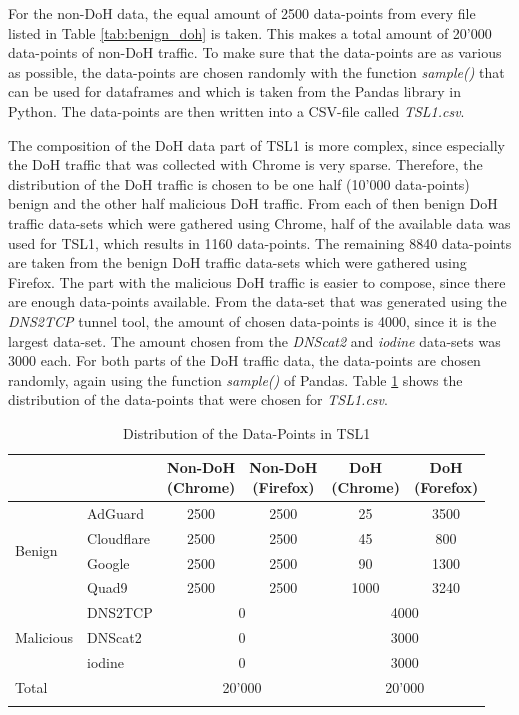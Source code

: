 For the non-DoH data, the equal amount of 2500 data-points from every file listed in Table \ref{tab:benign_doh} is taken. This makes a total amount of 20'000 data-points of non-DoH traffic. To make sure that the data-points are as various as possible, the data-points are chosen randomly with the function \textit{sample()} that can be used for dataframes and which is taken from the Pandas library \cite{pandas} in Python. The data-points are then written into a CSV-file called \textit{TSL1.csv}.

The composition of the DoH data part of TSL1 is more complex, since especially the DoH traffic that was collected with Chrome is very sparse. Therefore, the distribution of the DoH traffic is chosen to be one half (10'000 data-points) benign and the other half malicious DoH traffic. From  each of then benign DoH traffic data-sets which were gathered using Chrome, half of the available data was used for TSL1, which results in 1160 data-points. The remaining 8840 data-points are taken from the benign DoH traffic data-sets which were gathered using Firefox. The part with the malicious DoH traffic is easier to compose, since there are enough data-points available. From the data-set that was generated using the \textit{DNS2TCP} tunnel tool, the amount of chosen data-points is 4000, since it is the largest data-set. The amount chosen from the \textit{DNScat2} and \textit{iodine} data-sets was 3000 each. For both parts of the DoH traffic data, the data-points are chosen randomly, again using the function \textit{sample()} of Pandas. Table \ref{tab:tsl1} shows the distribution of the data-points that were chosen for \textit{TSL1.csv}.

\begin{center}
\begin{longtable}{ |l|l|c|c|c|c| }
\hline
\multicolumn{2}{|c|}{ } & \makecell{Non-DoH\\(Chrome)} & \makecell{Non-DoH\\(Firefox)} & \makecell{DoH\\(Chrome)} & \makecell{DoH\\(Forefox)} \\
\hline
\multirow{4}{*}{Benign}
& AdGuard & 2500 & 2500 & 25 & 3500 \\
& Cloudflare & 2500 & 2500 & 45 & 800 \\
& Google & 2500 & 2500 & 90 & 1300 \\
& Quad9 & 2500 & 2500 & 1000 & 3240  \\
\hline
\multirow{3}{*}{Malicious}
& DNS2TCP & \multicolumn{2}{|c|}{0} & \multicolumn{2}{|c|}{4000}  \\
& DNScat2 & \multicolumn{2}{|c|}{0} & \multicolumn{2}{|c|}{3000} \\
& iodine & \multicolumn{2}{|c|}{0} & \multicolumn{2}{|c|}{3000} \\
\hline
\multicolumn{2}{|l|}{Total} & \multicolumn{2}{|c|}{20'000} & \multicolumn{2}{|c|}{20'000} \\
\hline
\caption{Distribution of the Data-Points in TSL1}
\label{tab:tsl1}
\end{longtable}
\end{center}

